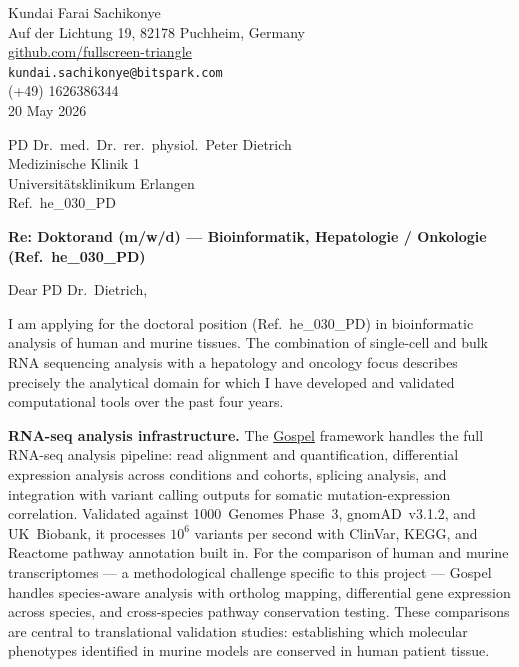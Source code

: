 \documentclass[12pt,a4paper]{article}
\begin{document}
\begin{flushright}
Kundai Farai Sachikonye \\
Auf der Lichtung 19, 82178 Puchheim, Germany \\
\href{https://github.com/fullscreen-triangle}{github.com/fullscreen-triangle} \\
\texttt{kundai.sachikonye@bitspark.com} \\
(+49) 1626386344 \\[6pt]
20 May 2026
\end{flushright}

\vspace{1em}

PD Dr.\ med.\ Dr.\ rer.\ physiol.\ Peter Dietrich \\
Medizinische Klinik 1 \\
Universitätsklinikum Erlangen \\
Ref.\ he\_030\_PD

\vspace{1.5em}

\textbf{Re: Doktorand (m/w/d) --- Bioinformatik, Hepatologie / Onkologie (Ref.\ he\_030\_PD)}

\vspace{1em}

Dear PD Dr.\ Dietrich,

I am applying for the doctoral position (Ref.\ he\_030\_PD) in bioinformatic
analysis of human and murine tissues.
The combination of single-cell and bulk RNA sequencing analysis with a
hepatology and oncology focus describes precisely the analytical domain
for which I have developed and validated computational tools over the
past four years.

\textbf{RNA-seq analysis infrastructure.}
The \href{https://github.com/fullscreen-triangle/gospel}{Gospel} framework
handles the full RNA-seq analysis pipeline: read alignment and quantification,
differential expression analysis across conditions and cohorts, splicing analysis,
and integration with variant calling outputs for somatic mutation-expression
correlation.
Validated against 1000~Genomes Phase~3, gnomAD~v3.1.2, and UK~Biobank,
it processes $10^6$ variants per second with ClinVar, KEGG, and Reactome
pathway annotation built in.
For the comparison of human and murine transcriptomes --- a methodological
challenge specific to this project --- Gospel handles species-aware analysis
with ortholog mapping, differential gene expression across species, and
cross-species pathway conservation testing.
These comparisons are central to translational validation studies:
establishing which molecular phenotypes identified in murine models
are conserved in human patient tissue.
\end{document}
